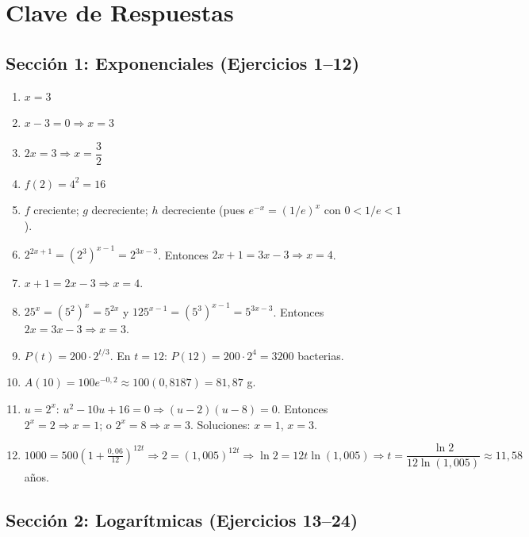 \documentclass[12pt, a4paper]{article}
\begin{document}
\newpage

\section{Clave de Respuestas}

\subsection*{Sección 1: Exponenciales (Ejercicios 1--12)}

\begin{enumerate}[leftmargin=*, label=\textbf{\arabic*.}]
  \item $x = 3$
  \item $x - 3 = 0 \Rightarrow x = 3$
  \item $2x = 3 \Rightarrow x = \dfrac{3}{2}$
  \item $f(2) = 4^2 = 16$
  \item $f$ creciente; $g$ decreciente; $h$ decreciente (pues $e^{-x} = (1/e)^x$ con $0 < 1/e < 1$).
  \item $2^{2x+1} = (2^3)^{x-1} = 2^{3x-3}$. Entonces $2x+1 = 3x-3 \Rightarrow x = 4$.
  \item $x + 1 = 2x - 3 \Rightarrow x = 4$.
  \item $25^x = (5^2)^x = 5^{2x}$ y $125^{x-1} = (5^3)^{x-1} = 5^{3x-3}$. Entonces $2x = 3x - 3 \Rightarrow x = 3$.
  \item $P(t) = 200 \cdot 2^{t/3}$. En $t = 12$: $P(12) = 200 \cdot 2^4 = 3200$ bacterias.
  \item $A(10) = 100 e^{-0{,}2} \approx 100(0{,}8187) = 81{,}87$ g.
  \item $u = 2^x$: $u^2 - 10u + 16 = 0 \Rightarrow (u - 2)(u - 8) = 0$. Entonces $2^x = 2 \Rightarrow x = 1$; o $2^x = 8 \Rightarrow x = 3$. Soluciones: $x = 1$, $x = 3$.
  \item $1000 = 500\left(1 + \frac{0{,}06}{12}\right)^{12t} \Rightarrow 2 = (1{,}005)^{12t} \Rightarrow \ln 2 = 12t \ln(1{,}005) \Rightarrow t = \dfrac{\ln 2}{12\ln(1{,}005)} \approx 11{,}58$ años.
\end{enumerate}

\subsection*{Sección 2: Logarítmicas (Ejercicios 13--24)}
\end{document}
